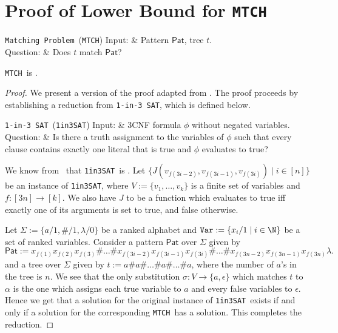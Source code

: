 \documentclass[12pt, a4paper]{article}
\newcommand{\matchingProblem}{\texttt{MTCH}}
\newcommand{\oneInThreeSat}{\texttt{1in3SAT}}
\newcommand{\matchingProblemFull}{\texttt{Matching Problem}}
\newcommand{\oneInThreeSatFull}{\texttt{1-in-3 SAT}}
\newcommand{\Alphabet}{\ensuremath{\Sigma}}
\newcommand{\Variables}{\texttt{Var}}
\newcommand{\substitution}{\ensuremath{\sigma}}
\newcommand{\pattern}{\mathsf{Pat}}
\newcommand{\probdef}[3]{
\begin{problem}[framed]{#1}
Input: & #2\\
Question: & #3
\end{problem}
}
\begin{document}
\section{Proof of Lower Bound for \matchingProblem}

\probdef{\matchingProblemFull\ (\matchingProblem)}
{Pattern $\pattern$, tree $t$.}
{Does $t$ match $\pattern$?}

\begin{theorem}\label{thm:matchingSngltn}
    \matchingProblem\ is \nph.
\end{theorem}

\begin{proof}
    We present a version of the proof adapted from \cite{MS2019}. The proof proceeds by establishing a reduction from \oneInThreeSatFull, which is defined below.
    \probdef{\oneInThreeSatFull\ (\oneInThreeSat)}
    {3CNF formula $\phi$ without negated variables.}
    {Is there a truth assignment to the variables of $\phi$ such that every clause contains exactly one literal that is true and $\phi$ evaluates to true?}
    We know from~\cite{S1978} that \oneInThreeSat\ is \npc.    
    Let $\{J(v_{f(3i-2)}, v_{f(3i-1)}, v_{f(3i)}) \mid i \in [n]\}$ be an instance of \oneInThreeSat, where $V := \{v_1, \dots, v_k\}$ is a finite set of variables and $f : [3n] \to [k]$. We also have $J$ to be a function which evaluates to true iff exactly one of its arguments is set to true, and false otherwise.
    
    Let $\Alphabet := \{a/1, \#/1, \lambda/0\}$ be a ranked alphabet and $\Variables := \{x_i/1 \mid i \in \N\}$ be a set of ranked variables. Consider a pattern $\pattern$ over $\Alphabet$ given by
    \[ \pattern := x_{f(1)}x_{f(2)}x_{f(3)}\#\dots\#x_{f(3i-2)}x_{f(3i-1)}x_{f(3i)}\#\dots\#x_{f(3n-2)}x_{f(3n-1)}x_{f(3n)}\lambda. \]
    and a tree over $\Alphabet$ given by $t := a\#a\#\dots\#a\#\dots\#a$, where the number of $a$'s in the tree is $n$. We see that the only substitution $\substitution : V \to \{a, \epsilon\}$ which matches $t$ to $\alpha$ is the one which assigns each true variable to $a$ and every false variables to $\epsilon$. Hence we get that a solution for the original instance of \oneInThreeSat\ exists if and only if a solution for the corresponding \matchingProblem\ has a solution. This completes the reduction.
\end{proof}



\newpage


\end{document}
